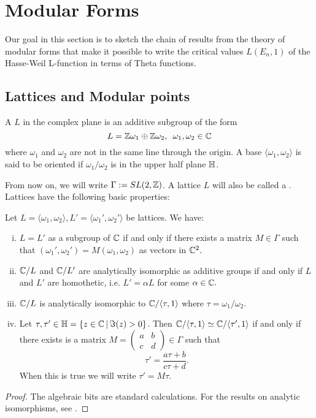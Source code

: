 \documentclass[12pt, a4paper]{report}
\begin{document}
\newpage

\chapter{Modular Forms}

Our goal in this section is to sketch the chain of results from the theory of
modular forms that make it possible to write the
critical values $L(E_n,1)$ of the Hasse-Weil L-function in terms of Theta functions. 

\section{Lattices and Modular points}

\begin{defn}
  A  $L$ in the complex plane is an additive subgroup of the form
  \[L = {\mathbb Z}\omega_1 \oplus {\mathbb Z}\omega_2, \,\,\, \omega_1, \omega_2 \in {\mathbb C} \]
  where $\omega_1$ and $\omega_2$ are not in the same line through the origin.
  A base $\langle \omega_1, \omega_2 \rangle$ is said to be oriented if
  $\omega_1/\omega_2$ is in the upper half plane $\mathbb{H}$.
\end{defn}

From now on, we will write $\Gamma := SL(2,{\mathbb Z})$.
A lattice $L$ will also be called a .
Lattices have the following basic properties:
\begin{prop} \label{lattice}
  Let $L = \langle \omega_1, \omega_2 \rangle, L' = \langle \omega_1', \omega_2'
  \rangle$ be lattices. We have:
  \begin{enumerate}[(i)]
  \item $L = L'$ as a subgroup of ${\mathbb C}$ if and only if there exists a matrix $M
    \in \Gamma$ such that $(\omega_1', \omega_2') = M (\omega_1, \omega_2)$
    as vectors in ${\mathbb C}^2.$
  \item ${\mathbb C} / L$ and ${\mathbb C} / L'$ are analytically isomorphic as additive groups
    if and only if $L$ and $L'$ are homothetic, i.e.
    $L' = \alpha L$ for some $\alpha \in {\mathbb C}.$
  \item ${\mathbb C} / L$ is analytically isomorphic to ${\mathbb C} /\langle \tau, 1
    \rangle$ where $\tau = \omega_1/\omega_2$.
  \item Let $\tau, \tau' \in \mathbb{H} = \{z \in {\mathbb C} \, | \, \Im(z) > 0 \}$.
    Then ${\mathbb C} / \langle \tau, 1 \rangle \simeq {\mathbb C} / \langle \tau', 1 \rangle$
  if and only if there exists is a matrix $M = \left(
    \begin{smallmatrix}
      a & b \\ c & d
    \end{smallmatrix} \right) \in \Gamma$
    such that
    \[\tau' = \frac{a\tau+b}{c\tau +d}. \]
    When this is true we will write $\tau' = M\tau$.
  \end{enumerate}
\end{prop}
\begin{proof}
  The algebraic bits are standard calculations. For the results on analytic
  isomorphisms, see \cite[Appendix B.6, pages 168-169]{simple}.
\end{proof}
\end{document}

